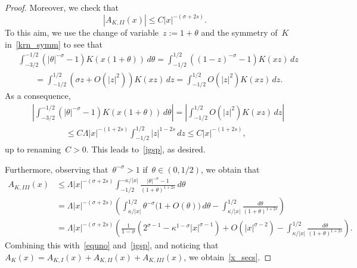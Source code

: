 \documentclass[10pt,a4paper]{amsart}
\begin{document}
\begin{proof}
Moreover, we check that
\begin{equation}\label{jgsp}
| A_{K,II}(x)| \leq C |x |^{-(\sigma+2s)}.
\end{equation}
To this aim, we use the change of variable~$z:= 1+\theta$ and
the symmetry of~$K$ in~\eqref{krn_symm}
to see that
\begin{equation*}
\begin{split}
&\int_{-{3}/{2}}^{-{1}/{2}} \left( |\theta|^{-\sigma}-1 \right) K \left( x(1+\theta)\right) \, d\theta 
= \int_{-{1}/{2}}^{{1}/{2}} \left( ( 1-z)^{-\sigma}-1\right) K(xz) \, dz \\
&\qquad=\int_{-{1}/{2}}^{{1}/{2}} \left( \sigma z +O(|z |^2) \right) K(xz) \, dz 
=\int_{-{1}/{2}}^{{1}/{2}} O(|z |^2) K(xz) \, dz.
\end{split}
\end{equation*}
As a consequence,
\begin{equation*}
\begin{split}
&\left| \int_{-{3}/{2}}^{-{1}/{2}} \left( |\theta|^{-\sigma}-1 \right) K \left( x(1+\theta)\right) \, d\theta \right|
= \left|\int_{-{1}/{2}}^{{1}/{2}} O(|z |^2)  K(xz) \, dz\right|\\
&\qquad\qquad\leq C\Lambda |x |^{-(1+2s)}  \int_{-{1}/{2}}^{{1}/{2}}| z|^{1-2s}\, dz \leq C |x |^{-(1+2s)} ,
\end{split}
\end{equation*} up to renaming~$C>0$.
This leads to~\eqref{jgsp}, as desired.

Furthermore, observing that~$\theta^{-\sigma}>1$ if~$\theta \in (0,1/2)$, we obtain that
\begin{equation*}
\begin{split}
A_{K,III}(x) & \leq \Lambda |x |^{-(\sigma+2s)} 
\int_{-{1}/{2}}^{-{\kappa}/{|x|}} \frac{ |\theta|^{-\sigma}-1}{ (1+\theta)^{1+2s}} \, d\theta\\
&= \Lambda |x |^{-(\sigma+2s)} 
\left(
\int_{{\kappa}/{| x |}}^{{1}/{2}} 
\theta^{-\sigma}\big(1+O(\theta)\big) \, d\theta -
\int_{{\kappa}/{|x |}}^{{1}/{2}} \frac{d\theta}{(1+\theta)^{1+2s}}\right)\\
&= \Lambda |x |^{-(\sigma+2s)} 
\left( \frac{1}{1-\sigma}\left(2^{\sigma-1} -\kappa^{1-\sigma}|x|^{\sigma-1} \right) +O(|x|^{\sigma-2})
-\int_{{\kappa}/{|x |}}^{{1}/{2}} \frac{d\theta}{(1+\theta)^{1+2s}}\right).
\end{split}
\end{equation*}
Combining this with~\eqref{equno} and~\eqref{jgsp},
and noticing that~$A_K(x) = A_{K,I}(x)+ A_{K,II}(x)+ A_{K,III}(x)$,
we obtain~\eqref{x_secs}. 


\end{proof}
\end{document}
